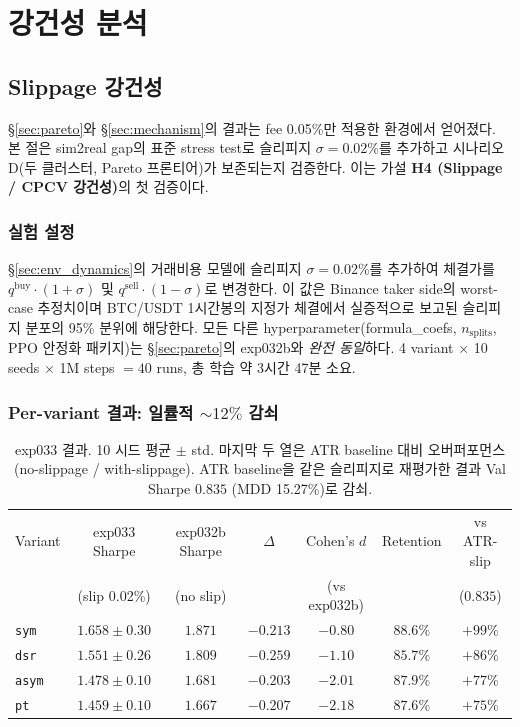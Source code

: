 \documentclass[11pt, a4paper]{article}
\begin{document}
\section{강건성 분석}
\label{sec:robustness}

\subsection{Slippage 강건성}
\label{sec:slippage}

\S\ref{sec:pareto}와 \S\ref{sec:mechanism}의 결과는 fee 0.05\%만 적용한
환경에서 얻어졌다. 본 절은 sim2real gap의 표준 stress test로 슬리피지
$\sigma = 0.02\%$를 추가하고 시나리오 D(두 클러스터, Pareto 프론티어)가 보존되는지
검증한다. 이는 가설 \textbf{H4 (Slippage / CPCV 강건성)}의 첫 검증이다.

\subsubsection{실험 설정}
\label{sec:slippage_setup}

\S\ref{sec:env_dynamics}의 거래비용 모델에 슬리피지 $\sigma = 0.02\%$를 추가하여
체결가를 $q^{\mathrm{buy}} \cdot (1+\sigma)$ 및 $q^{\mathrm{sell}} \cdot (1-\sigma)$로
변경한다. 이 값은 Binance taker side의 worst-case 추정치이며 BTC/USDT 1시간봉의
지정가 체결에서 실증적으로 보고된 슬리피지 분포의 95\% 분위에 해당한다. 모든
다른 hyperparameter(formula\_coefs, $n_{\text{splits}}$, PPO 안정화 패키지)는
\S\ref{sec:pareto}의 exp032b와 \emph{완전 동일}하다. 4 variant $\times$ 10 seeds
$\times$ 1M steps $= 40$ runs, 총 학습 약 3시간 47분 소요.

\subsubsection{Per-variant 결과: 일률적 $\sim 12\%$ 감쇠}
\label{sec:slippage_per_variant}

\begin{table}[!htbp]
\centering
\small
\caption{exp033 결과. 10 시드 평균 $\pm$ std. 마지막 두 열은 ATR baseline 대비
오버퍼포먼스(no-slippage / with-slippage). ATR baseline을 같은 슬리피지로
재평가한 결과 Val Sharpe $0.835$ (MDD 15.27\%)로 감쇠.}
\begin{tabular}{lcccccc}
\toprule
Variant & exp033 Sharpe & exp032b Sharpe & $\Delta$ & Cohen's $d$ & Retention & vs ATR-slip \\
 & (slip 0.02\%) & (no slip) & & (vs exp032b) & & ($0.835$) \\
\midrule
\texttt{sym}  & $1.658 \pm 0.30$ & $1.871$ & $-0.213$ & $-0.80$ & $88.6\%$ & $+99\%$ \\
\texttt{dsr}  & $1.551 \pm 0.26$ & $1.809$ & $-0.259$ & $-1.10$ & $85.7\%$ & $+86\%$ \\
\texttt{asym} & $1.478 \pm 0.10$ & $1.681$ & $-0.203$ & $-2.01$ & $87.9\%$ & $+77\%$ \\
\texttt{pt}   & $1.459 \pm 0.10$ & $1.667$ & $-0.207$ & $-2.18$ & $87.6\%$ & $+75\%$ \\
\bottomrule
\end{tabular}
\label{tab:slippage_per_variant}
\end{table}
\end{document}
